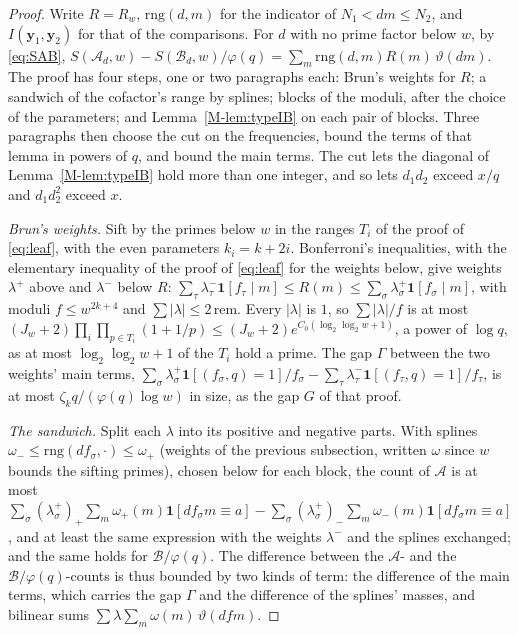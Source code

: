 \documentclass[11pt]{article}
\numberwithin{equation}{section}
\begin{document}
\begin{proof}
Write $R = R_w$, $\mathrm{rng}(d, m)$ for the indicator of $N_1 < dm \le N_2$, and $I(\mathbf y_1, \mathbf y_2)$ for
that of the comparisons. For $d$ with no prime factor below $w$, by \eqref{eq:SAB}, $S(\mathcal A_d, w) - S(\mathcal
B_d, w)/\varphi(q) = \sum_m \mathrm{rng}(d, m) R(m) \, \vartheta(dm)$. The proof has four steps, one or two
paragraphs each: Brun's weights for $R$; a sandwich of the cofactor's range by splines; blocks of the moduli, after the
choice of the parameters; and Lemma~\ref{M-lem:typeIB} on each pair of blocks. Three paragraphs then choose the cut
on the frequencies, bound the terms of that lemma in powers of $q$, and bound the main terms. The cut lets the diagonal
of Lemma~\ref{M-lem:typeIB} hold more than one integer, and so lets $d_1 d_2$ exceed $x/q$ and $d_1 d_2^2$ exceed $x$.

\emph{Brun's weights.} Sift by the primes below $w$ in the ranges $T_i$ of the proof of \eqref{eq:leaf}, with the even
parameters $k_i = k + 2i$. Bonferroni's inequalities, with the elementary inequality of the proof of \eqref{eq:leaf}
for the weights below, give weights $\lambda^+$ above and $\lambda^-$ below $R$: $\sum_\tau \lambda^-_\tau \mathbf
1[f_\tau \mid m] \le R(m) \le \sum_\sigma \lambda^+_\sigma \mathbf 1[f_\sigma \mid m]$, with moduli $f \le w^{2k + 4}$
and $\sum |\lambda| \le 2\,\mathrm{rem}$. Every $|\lambda|$ is $1$, so $\sum |\lambda|/f$ is at most $(J_w + 2)
\prod_i \prod_{p \in T_i}(1 + 1/p) \le (J_w + 2) e^{C_0(\log_2 \log_2 w + 1)}$, a power of $\log q$, as at most
$\log_2 \log_2 w + 1$ of the $T_i$ hold a prime. The gap $\Gamma$ between the two weights' main terms, $\sum_\sigma
\lambda^+_\sigma \mathbf 1[(f_\sigma, q) = 1]/f_\sigma - \sum_\tau \lambda^-_\tau \mathbf 1[(f_\tau, q) = 1]/f_\tau$,
is at most $\zeta_k q/(\varphi(q) \log w)$ in size, as the gap $G$ of that proof.

\emph{The sandwich.} Split each $\lambda$ into its positive and negative parts. With splines $\omega_- \le
\mathrm{rng}(d f_\sigma, \cdot) \le \omega_+$ (weights of the previous subsection, written $\omega$ since $w$ bounds the
sifting primes), chosen below for each block, the count of $\mathcal A$ is at most $\sum_\sigma (\lambda^+_\sigma)_+
\sum_m \omega_+(m) \mathbf 1[d f_\sigma m \equiv a] - \sum_\sigma (\lambda^+_\sigma)_- \sum_m \omega_-(m) \mathbf 1[d
f_\sigma m \equiv a]$, and at least the same expression with the weights $\lambda^-$ and the splines
exchanged; and the same holds for $\mathcal B/\varphi(q)$. The difference between the $\mathcal A$- and the $\mathcal
B/\varphi(q)$-counts is thus bounded by two kinds of term: the difference of the main terms, which carries the gap
$\Gamma$ and the difference of the splines' masses, and bilinear sums
$\sum \lambda \sum_m \omega(m) \, \vartheta(d f m)$.


\end{proof}
\end{document}

